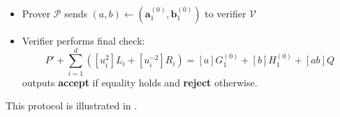 \documentclass[../../book.tex]{subfiles}
\begin{document}
\begin{definition}
\begin{itemize}
\begin{itemize}
                \item $\mathcal{P}$ computes:
                    \begin{align*}
                        \mathbf{a}^{(k-1)} &= \mathbf{a_{lo}}^{(k)} \cdot u_k + u_k^{-1} \cdot \mathbf{a_{hi}}^{(k)} \\
                        \mathbf{b}^{(k-1)} &= \mathbf{b_{lo}}^{(k)} \cdot u_k^{-1} + u_k \cdot \mathbf{b_{hi}}^{(k)} \\
                    \end{align*}
            \end{itemize}
        \item Prover $\mathcal{P}$ sends $(a,b) \gets (\mathbf{a}_1^{(0)}, \mathbf{b}_1^{(0)})$ to verifier $\mathcal{V}$
        \item Verifier performs final check: 
            $$P' + \sum_{i=1}^d ([u_i^2]L_i + [u_i^{-2}]R_i) = [a]G_1^{(0)} + [b]H_1^{(0)} + [ab]Q$$
        outputs \textbf{accept} if equality holds and \textbf{reject} otherwise.
    \end{itemize}

    This protocol is illustrated in . 
\end{definition}
\end{document}
